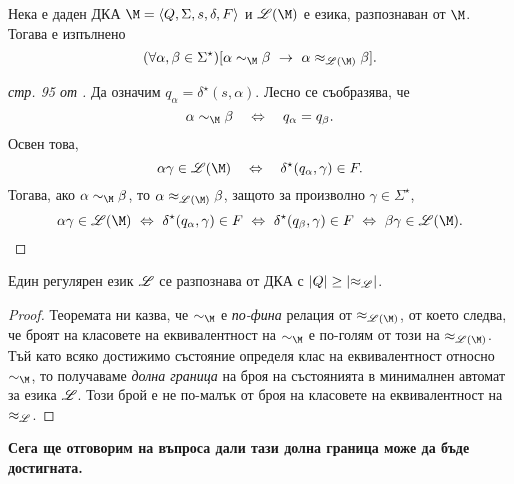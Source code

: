 
\begin{thm}
  \label{th:rel-finer}
  Нека е даден ДКА $\M = \FA$ и $\Ls(\M)$ е езика, разпознаван от $\M$. Тогава е изпълнено
  \[(\forall \alpha,\beta \in \Sigma^\star)[\alpha\sim_\M\beta\ \rightarrow\ \alpha\approx_{\Ls(\M)}\beta].\]
\end{thm}
\begin{proof}[стр. 95 от \cite{papadimitriou}]
  Да означим $q_\alpha = \delta^\star(s, \alpha)$.
  Лесно се съобразява, че 
  \[\alpha \sim_\M \beta\quad\Leftrightarrow\quad q_\alpha = q_\beta.\]
  Освен това, 
  \[\alpha\gamma \in \Ls(\M)\quad \Leftrightarrow\quad \delta^\star(q_\alpha, \gamma) \in F.\]
  Тогава, ако $\alpha \sim_\M \beta$, то  $\alpha \approx_{\Ls(\M)}\beta$, защото за произволно $\gamma \in \Sigma^\star$,
  \[\alpha\gamma \in \Ls(\M)\ \Leftrightarrow\ \delta^\star(q_\alpha,\gamma) \in F\ \Leftrightarrow\ \delta^\star(q_\beta, \gamma)\in F\ \Leftrightarrow\ \beta\gamma \in \Ls(\M).\]  
\end{proof}

\begin{cor}
  Един регулярен език $\mathscr{L}$ се разпознава от ДКА с $\vert{Q}\vert \geq \vert{\approx_{\mathscr{L}}}\vert$.
\end{cor}
\begin{proof}
  Теоремата ни казва, че $\sim_\M$ е {\em по-фина} релация от $\approx_{\Ls(\M)}$, от което следва, че
  броят на класовете на еквивалентност на $\sim_\M$ е по-голям от този на $\approx_{\Ls(\M)}$.
  Тъй като всяко достижимо състояние определя клас на еквивалентност относно $\sim_\M$,
  то получаваме {\em долна граница} на броя на състоянията в минималнен автомат за езика $\mathscr{L}$.
  Този брой е не по-малък от броя на класовете на еквивалентност на $\approx_{\mathscr{L}}$.
  
\end{proof}

{\bf Сега ще отговорим на въпроса дали тази долна граница може да бъде достигната.}

